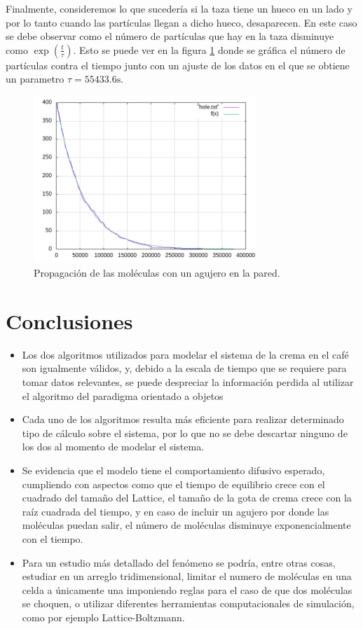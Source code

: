 \documentclass[12pt,twocolumn]{article}
\begin{document}
Finalmente, consideremos lo que sucedería si la taza tiene un hueco en un lado y por lo tanto cuando las partículas llegan a dicho hueco, desaparecen. En este caso se debe observar como el número de partículas que hay en la taza disminuye como $\exp{(\frac{t}{\tau})}$. Esto se puede ver en la figura \ref{fig:hole} donde se gráfica el número de partículas contra el tiempo junto con un ajuste de los datos en el que se obtiene un parametro $\tau = 55433.6\mathrm{s}$.
\begin{figure}
    \centering
    \includegraphics[width=0.75\textwidth]{figs/hole.png}
    \caption{Propagación de las moléculas con un agujero en la pared.}
    \label{fig:hole}
\end{figure}



\section{Conclusiones}
\begin{itemize}
    \item Los dos algoritmos utilizados para modelar el sistema de la crema en el café son 
    igualmente válidos, y, debido a la escala de tiempo que se requiere para tomar datos 
    relevantes, se puede despreciar la información perdida al utilizar el algoritmo del 
    paradigma orientado a objetos
    \item Cada uno de los algoritmos resulta más eficiente para realizar determinado tipo de 
    cálculo sobre el sistema, por lo que no se debe descartar ninguno de los dos al momento 
    de modelar el sistema.
    \item Se evidencia que el modelo tiene el comportamiento difusivo esperado, cumpliendo 
    con aspectos como que el tiempo de equilibrio crece con el cuadrado del tamaño del Lattice, 
    el tamaño de la gota de crema crece con la raíz cuadrada del tiempo, y en caso de incluir 
    un agujero por donde las moléculas puedan salir, el número de moléculas disminuye 
    exponencialmente con el tiempo.
    \item Para un estudio más detallado del fenómeno se podría, entre otras cosas, estudiar 
    en un arreglo tridimensional, limitar el numero de moléculas en una celda a únicamente 
    una imponiendo reglas para el caso de que dos moléculas se choquen, o utilizar diferentes 
    herramientas computacionales de simulación, como por ejemplo Lattice-Boltzmann.
\end{itemize}
\end{document}
